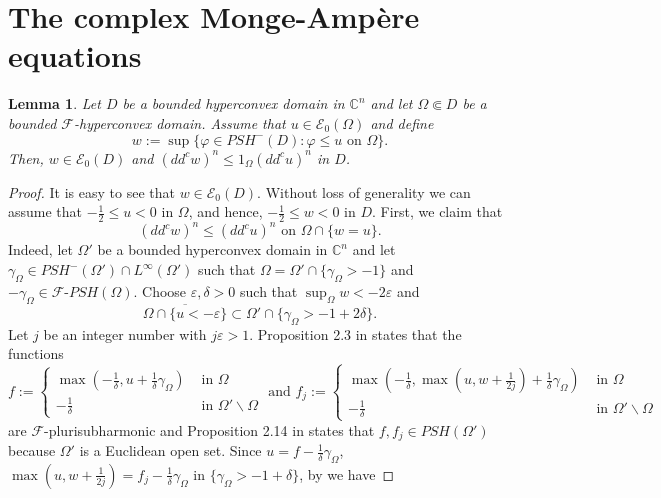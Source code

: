 \documentclass[3p,times]{elsarticle}
\numberwithin{equation}{section}
\newtheorem{lemma}[theorem]{Lemma}
\newtheorem{The main theorem}[theorem]{The main theorem}
\theoremstyle{definition}
\begin{document}
\section{The complex Monge-Amp\`ere equations}


\begin{lemma} \label{lem1}
Let $D $ be a bounded hyperconvex domain in $\mathbb C^n$  and let $ \Omega \Subset D$ be  a bounded $\mathcal F$-hyperconvex domain. 
Assume that $u \in \mathcal E_0(\Omega)  $ and define 
$$
w:=\sup\{ \varphi \in PSH^-(D): \varphi \leq u \text{ on } \Omega\}.
$$
Then, $w \in \mathcal E_0(D)$ and $(dd^c w)^n \leq 1_\Omega (dd^c u)^n$ in $D$. 
\end{lemma}

\begin{proof}
It is easy to see that $w \in \mathcal E_0(D)$. Without loss of generality we can assume that $- \frac{1}{2}\leq u < 0$ in $\Omega$, and hence, $- \frac{1}{2}\leq w < 0$ in $D$. 
First, we claim that 
\begin{equation} \label{eq999-21}
 (dd^c w)^n \leq  (dd^c u)^n \text{ on } \Omega \cap  \{w=u\}.
\end{equation}
Indeed, 
let $\Omega'$ be a bounded hyperconvex domain in $\mathbb C^n$ and let  $\gamma_\Omega \in PSH^-(\Omega') \cap L^\infty( \Omega')$ such that   $\Omega= \Omega' \cap \{\gamma_\Omega >-1\} $ and $-\gamma_\Omega  \in \mathcal F\text{-}PSH(\Omega)$. 
Choose $\varepsilon, \delta>0$ such that $\sup_\Omega w <-2\varepsilon$   and  
$$\overline{\Omega\cap  \{u<- \varepsilon\} } \subset  \Omega' \cap\{\gamma_\Omega >-1+  2 \delta\}.$$ 
Let $j$ be an integer number with $j \varepsilon >1$.
Proposition 2.3 in \cite{KS14} states that the functions 
$$f := 
\begin{cases}
\max(- \frac{1}{\delta}, u+  \frac{1}{\delta}  \gamma_\Omega ) & \text{ in } \Omega
\\ -  \frac{1}{\delta}& \text{ in } \Omega' \backslash \Omega
\end{cases}  
\text{ and }
f _j := 
\begin{cases}
\max(- \frac{1}{\delta}, \max(u, w+\frac{1}{2j}) +  \frac{1}{\delta}  \gamma_\Omega ) & \text{ in } \Omega
\\ -  \frac{1}{\delta}& \text{ in } \Omega' \backslash \Omega
\end{cases}  
$$  
are   $\mathcal F$-plurisubharmonic   and Proposition 2.14 in \cite{KFW11} states that $f , f_j \in  PSH(\Omega')$ because $\Omega' $ is a Euclidean open set.
Since   $u=f- \frac{1}{\delta }  \gamma_\Omega $, $\max(u, w +\frac{1}{2j}) =f_j - \frac{1}{\delta }  \gamma_\Omega $  in $\{ \gamma_\Omega  >-1+\delta \}$, by \cite{BT87} we have 

\end{proof}
\end{document}
